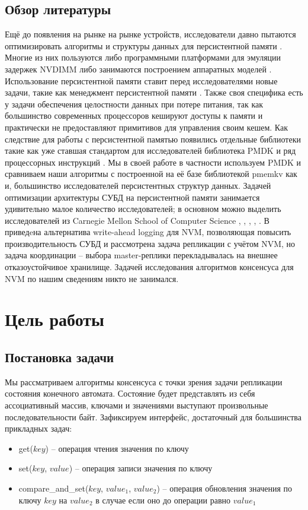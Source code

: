 \documentclass[pdftex,ptm,12pt,a4paper]{report}
\theoremstyle{definition}
\begin{document}
\section{Обзор литературы}
Ещё до появления на рынке на рынке устройств, исследователи давно пытаются оптимизировать алгоритмы \cite{iwabuchi2014nvm} и структуры данных \cite{chen2015persistent} для персистентной памяти .
Многие из них пользуются либо программными платформами для эмуляции задержек NVDIMM \cite{sengupta2015framework} либо занимаются построением аппаратных моделей \cite{dong2012nvsim}.
Использование персистентной памяти ставит перед исследователями новые задачи, такие как менеджмент персистентной памяти \cite{schwalb2015nvm}. Также своя специфика есть у задачи обеспечения
целостности данных при потере питания, так как большинство современных процессоров кешируют доступы к памяти и практически не предоставляют примитивов для управления своим кешем.
Как следствие для работы с персистентной памятью появились отдельные библиотеки такие как уже ставшая стандартом для исследователей библиотека PMDK \cite{pmdk}
и ряд процессорных инструкций \cite{kolli2016delegated}.  Мы в своей работе в частности используем PMDK и сравниваем наши алгоритмы с построенной на её базе библиотекой pmemkv 
\cite{pmemkv} как и, большинство исследователей персистентных структур данных.
Задачей оптимизации архитектуры СУБД на персистентной памяти занимается удивительно малое количество исследователей; в основном можно выделить исследователей из Carnegie Mellon School of Computer Science
\cite{pavlo17}, \cite{arulraj2015let}, \cite{debrabant2014prolegomenon}, \cite{arulraj2017build}, \cite{writebehind}.  В \cite{writebehind} приведeна альтернатива write-ahead logging
для NVM, позволяющая повысить производительность СУБД и рассмотрена задача репликации с учётом NVM, но задача координации -- выбора master-реплики перекладывалась на внешнее отказоустойчивое хранилище.
Задачей исследования алгоритмов консенсуса для NVM по нашим сведениям никто не занимался.

\chapter{Цель работы}
\section{Постановка задачи}
Мы рассматриваем алгоритмы консенсуса с точки зрения задачи репликации состояния конечного автомата. Состояние будет представлять из себя ассоциативный массив, ключами и значениями
выступают произвольные последовательности байт. Зафиксируем интерфейс, достаточный для большинства прикладных задач:
\begin{itemize}
    \item get($key$) -- операция чтения значения по ключу
    \item set($key$, $value$) -- операция записи значения по ключу
    \item compare\_and\_set($key$, $value_1$, $value_2$) -- операция обновления значения по ключу $key$ на $value_2$ в случае если оно до операции равно $value_1$
\end{itemize}
\end{document}
